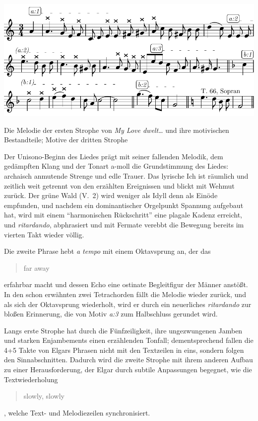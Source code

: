 \documentclass[a4paper,11pt,open=any]{scrbook}
\newcommand{\engquote}[1]{\foreignblockquote{english}{#1}}
\begin{document}
\begin{notenbeispiel}
 \includegraphics{nbs-my-love-motivik.pdf}
 \caption{Die Melodie der ersten Strophe von \textit{My Love dwelt…} und
 ihre motivischen Bestandteile; Motive der dritten Strophe}
 \label{nbs:my-love-motivik}
\end{notenbeispiel}

Der Unisono-Beginn des Liedes prägt mit seiner fallenden Melodik, dem
gedämpften Klang und der Tonart a-moll die Grundstimmung des Liedes:
archaisch anmutende Strenge und edle Trauer.  Das lyrische Ich ist
räumlich und zeitlich weit getrennt von den erzählten Ereignissen und
blickt mit Wehmut zurück.  Der grüne Wald (V.~2) wird weniger als Idyll
denn als Einöde empfunden, und nachdem ein dominantischer Orgelpunkt
Spannung aufgebaut hat, wird mit einem \enquote{harmonischen Rückschritt}
eine plagale Kadenz erreicht, und \textit{ritardando}, abphrasiert und mit
Fermate verebbt die Bewegung bereits im vierten Takt wieder völlig.

Die zweite Phrase hebt \textit{a tempo} mit einem Oktavsprung an, der das
\engquote{far away} erfahrbar macht und dessen Echo eine ostinate
Begleitfigur der Männer anstößt.  In den schon erwähnten zwei Tetrachorden
fällt die Melodie wieder zurück, und als sich der Oktavsprung wiederholt,
wird er durch ein neuerliches \textit{ritardando} zur bloßen Erinnerung,
die von Motiv \textit{a:3} zum Halbschluss gerundet wird.

Langs erste Strophe hat durch die Fünfzeiligkeit, ihre ungezwungenen
Jamben und starken Enjambements einen erzählenden Tonfall; dementsprechend
fallen die 4+5 Takte von Elgars Phrasen nicht mit den Textzeilen in eins,
sondern folgen den Sinnabschnitten.  Dadurch wird die zweite Strophe mit
ihrem anderen Aufbau zu einer Herausforderung, der Elgar durch subtile
Anpassungen begegnet, wie die Textwiederholung \engquote{slowly, slowly},
welche Text- und Melodiezeilen synchronisiert.
\end{document}
